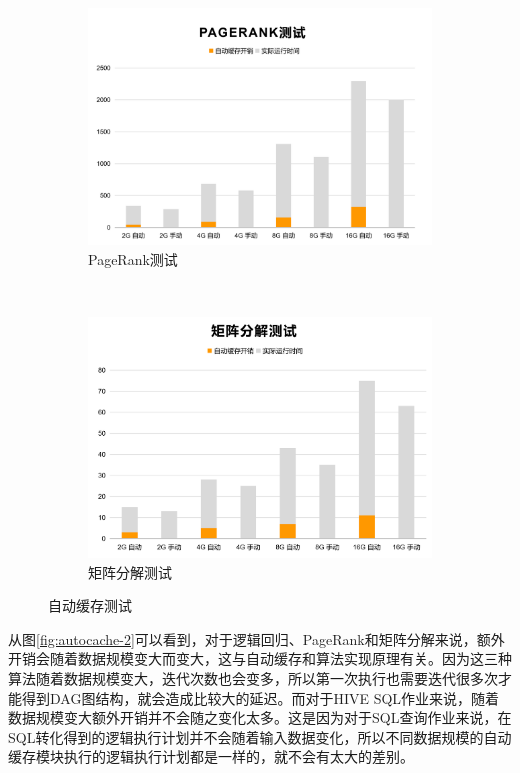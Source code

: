 \begin{figure}[!htbp]
\begin{subfigure}[b]{0.45\linewidth}
      \includegraphics[width=\textwidth]{Img/PAGERANK-cache.png}
      \caption{PageRank测试}
      \label{fig:pagerank-auto-cache}
    \end{subfigure}%
    ~%
    \begin{subfigure}[b]{0.45\linewidth}
      \includegraphics[width=\textwidth]{Img/MATRIX-cache.png}
      \caption{矩阵分解测试}
      \label{fig:matrix-auto-cache}
    \end{subfigure}
    \caption{自动缓存测试}
    \label{fig:auto-cache}
\end{figure}

从图\ref{fig:autocache-2}可以看到，对于逻辑回归、PageRank和矩阵分解来说，额外开销会随着数据规模变大而变大，这与自动缓存和算法实现原理有关。因为这三种算法随着数据规模变大，迭代次数也会变多，所以第一次执行也需要迭代很多次才能得到DAG图结构，就会造成比较大的延迟。而对于HIVE SQL作业来说，随着数据规模变大额外开销并不会随之变化太多。这是因为对于SQL查询作业来说，在SQL转化得到的逻辑执行计划并不会随着输入数据变化，所以不同数据规模的自动缓存模块执行的逻辑执行计划都是一样的，就不会有太大的差别。

